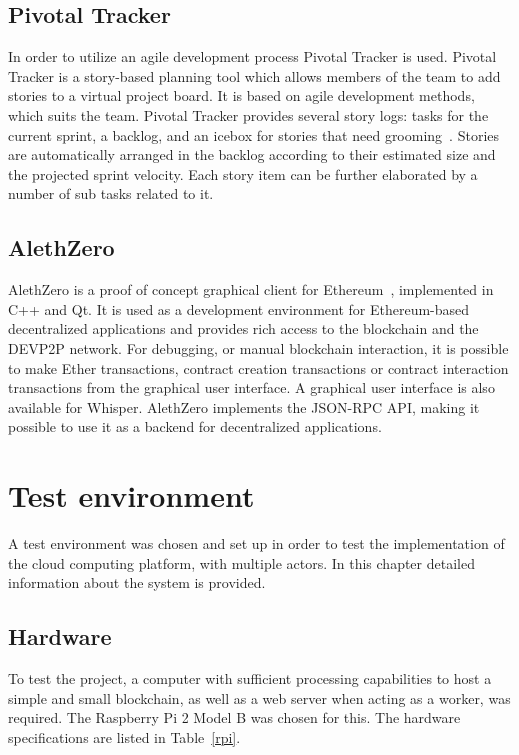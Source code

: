 \subsection{Pivotal Tracker}
In order to utilize an agile development process Pivotal Tracker is used. Pivotal Tracker is a story-based planning tool which allows members of the team to add stories to a virtual project board. It is based on agile development methods, which suits the team. Pivotal Tracker provides several story logs: tasks for the current sprint, a backlog, and an icebox for stories that need grooming~\cite{pivotaltracker}. Stories are automatically arranged in the backlog according to their estimated size and the projected sprint velocity. Each story item can be further elaborated by a number of sub tasks related to it. 

\subsection{AlethZero}
AlethZero is a proof of concept graphical client for Ethereum~\cite{github-alethzero}, implemented in C++ and Qt. It is used as a development environment for Ethereum-based decentralized applications and provides rich access to the blockchain and the DEVP2P network. For debugging, or manual blockchain interaction, it is possible to make Ether transactions, contract creation transactions or contract interaction transactions from the graphical user interface. A graphical user interface is also available for Whisper. AlethZero implements the JSON-RPC API, making it possible to use it as a backend for decentralized applications.

\section{Test environment}
A test environment was chosen and set up in order to test the implementation of the cloud computing platform, with multiple actors. In this chapter detailed information about the system is provided.

\subsection{Hardware}
To test the project, a computer with sufficient processing capabilities to host a simple and small blockchain, as well as a web server when acting as a worker, was required. The Raspberry Pi 2 Model B was chosen for this. The hardware specifications are listed in Table~\ref{rpi}.


